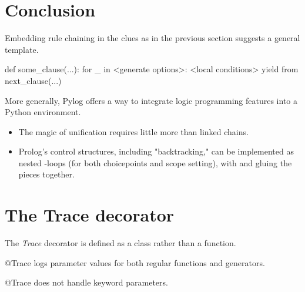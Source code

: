 \section{Conclusion}\label{sec:conclusion}
Embedding rule chaining in the clues as in the previous section suggests a general template.

\begin{minipage}{\linewidth}
\begin{python}
   def some_clause(...):
     for _ in <generate options>:
       <local conditions>
       yield from next_clause(...)
\end{python}
\end{minipage}

More generally, Pylog offers a way to integrate logic programming features into a Python environment.

\begin{itemize}
  \item The magic of unification requires little more than linked chains.
  \item Prolog's control structures, including "backtracking," can be implemented as nested -loops (for both choicepoints and scope setting), with  and  gluing the pieces together.
\end{itemize}

\appendix 
\section{The Trace decorator}

The \textit{Trace} decorator is defined as a class rather than a function. 

@Trace logs parameter values for both regular functions and generators. 

@Trace does not handle keyword parameters.

